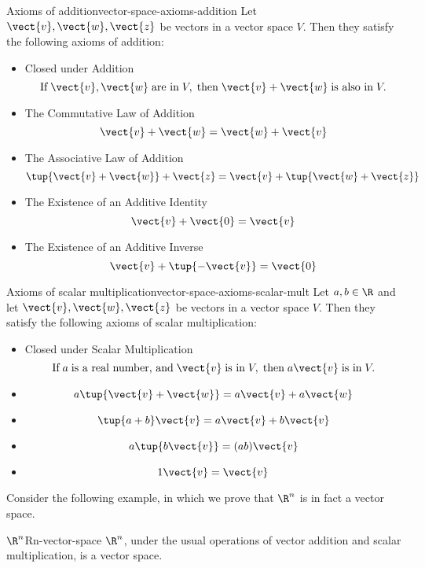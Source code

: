\begin{definition}{Axioms of addition}{vector-space-axioms-addition}
Let $\vect{v}, \vect{w}, \vect{z}$ be vectors in a vector space $V$. Then they satisfy the following axioms of addition:

\begin{itemize}
\item Closed under Addition
\[ \mbox{If}\; \vect{v}, \vect{w} \;\mbox{are in}\; V, \;\mbox{then}\; \vect{v}+\vect{w} \;\mbox{is also in}\; V.
\] 
\item The Commutative Law of Addition
\[
\vect{v}+\vect{w}=\vect{w}+\vect{v}
\]
\item The Associative Law of Addition
\[
\tup{\vect{v}+\vect{w}} +\vect{z}=\vect{v}+\tup{\vect{w}+
\vect{z}} 
\]
\item The Existence of an Additive Identity
\[
\vect{v}+\vect{0}=\vect{v}
\]
\item The Existence of an Additive Inverse
\[
\vect{v}+\tup{-\vect{v}} =\vect{0}
\]
\end{itemize}
\end{definition}

\begin{definition}{Axioms of scalar multiplication}{vector-space-axioms-scalar-mult}
Let $a, b \in \R$ and let $\vect{v}, \vect{w}, \vect{z}$ be vectors in a vector space $V$. Then they satisfy the following axioms of scalar multiplication:

\begin{itemize}
\item Closed under Scalar Multiplication
\[ \mbox{If}\; a \;\mbox{is a real number, and}\; \vect{v} \;\mbox{is in}\; V, \;\mbox{then}\; a\vect{v} \;\mbox{is in}\; V.
\]
\item
\[
a \tup{\vect{v}+\vect{w}} = a \vect{v}+ a \vect{w}  \label{e.01}
\]
\item
\[
\tup{a + b } \vect{v}= a \vect{v}+ b \vect{v}
\label{e.02}
\]
\item
\[
a \tup{b \vect{v}} = (a b) \vect{v}
\label{e.03}
\]
\item
\[
1\vect{v}=\vect{v}  \label{e.04}
\]
\end{itemize}
\end{definition}

Consider the following example, in which we prove that $\R^n$ is in fact a vector space.

\begin{example}{$\R^n$}{Rn-vector-space}
$\R^n$, under the usual operations of vector addition and scalar multiplication, is a vector space.
\end{example}

